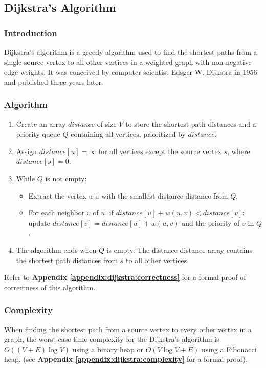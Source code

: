 	\subsection{Dijkstra's Algorithm}
		\subsubsection{Introduction}
			Dijkstra's algorithm is a greedy algorithm used to find the shortest paths from a single source vertex to all other vertices in a weighted graph with non-negative edge weights. It was conceived by computer scientist Edsger W. Dijkstra in 1956 and published three years later.
		\subsubsection{Algorithm}
		\begin{enumerate}
			\item Create an array $distance$ of size $V$ to store the shortest path distances and a priority queue $Q$ containing all vertices, prioritized by $distance$.
			\item Assign $distance[u] = \infty$ for all vertices except the source vertex $s$, where $distance[s] = 0$.
			\item While $Q$ is not empty:
				\begin{itemize}
					\item Extract the vertex u u with the smallest distance distance from $Q$.
					\item For each neighbor $v$ of $u$, if $distance[u] + w(u,v) < distance[v]$: update $distance[v]=distance[u]+w(u,v)$ and the priority of $v$ in $Q$.
				\end{itemize}
			\item The algorithm ends when $Q$ is empty. The distance distance array contains the shortest path distances from $s$ to all other vertices.
		\end{enumerate}
			Refer to \textbf{Appendix \ref{appendix:dijkstra:correctness}} for a formal proof of correctness of this algorithm.
		\subsubsection{Complexity}
			When finding the shortest path from a source vertex to every other vertex in a graph, the worst-case time complexity for the Dijkstra's algorithm is $O((V+E)\log{V})$ using a binary heap or $O(V\log{V}+E)$ using a Fibonacci heap. (see \textbf{Appendix \ref{appendix:dijkstra:complexity}} for a formal proof). \medskip
			
